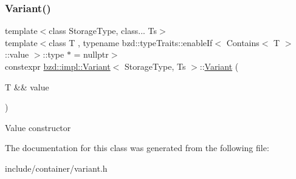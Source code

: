\subsubsection{\texorpdfstring{Variant()}{Variant()}\hspace{0.1cm}{\footnotesize\ttfamily [2/2]}}
{\footnotesize\ttfamily template$<$class Storage\+Type, class... Ts$>$ \\
template$<$class T , typename bzd\+::type\+Traits\+::enable\+If$<$ Contains$<$ T $>$\+::value $>$\+::type $\ast$  = nullptr$>$ \\
constexpr \hyperlink{classbzd_1_1impl_1_1Variant}{bzd\+::impl\+::\+Variant}$<$ Storage\+Type, Ts $>$\+::\hyperlink{classbzd_1_1impl_1_1Variant}{Variant} (\begin{DoxyParamCaption}\item[{T \&\&}]{value }\end{DoxyParamCaption})\hspace{0.3cm}{\ttfamily [inline]}}

Value constructor 

The documentation for this class was generated from the following file\+:\begin{DoxyCompactItemize}
\item 
include/container/variant.\+h\end{DoxyCompactItemize}
